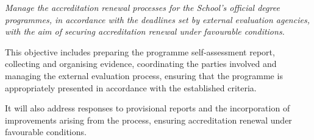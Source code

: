 \documentclass[11pt,a4paper]{scrreprt}
\begin{document}
\newpage
{}
{\small\color{mutedcolor}\itshape Manage the accreditation renewal processes for the School's official degree programmes, in accordance with the deadlines set by external evaluation agencies, with the aim of securing accreditation renewal under favourable conditions. 

This objective includes preparing the programme self-assessment report, collecting and organising evidence, coordinating the parties involved and managing the external evaluation process, ensuring that the programme is appropriately presented in accordance with the established criteria. 

It will also address responses to provisional reports and the incorporation of improvements arising from the process, ensuring accreditation renewal under favourable conditions. }\par\vspace{6pt}
\end{document}

